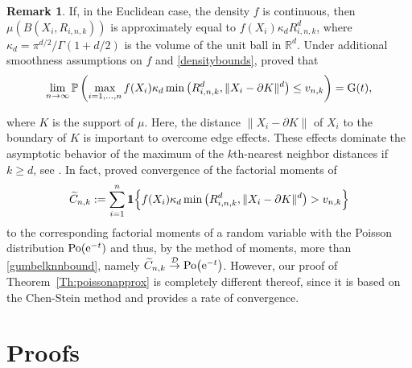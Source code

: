 \documentclass{article}
\theoremstyle{thm}
\theoremstyle{definition}
\newtheorem{remark}[theorem]{Remark}
\theoremstyle{definition}
\theoremstyle{def}
\newcommand{\RR}{\mathbb{R}} %
\newcommand{\PP}{\mathbb{P}} %
\newcommand{\ind}{1\hspace{-0,9ex}1}
\begin{document}
\begin{remark}
If, in the Euclidean case, the density $f$ is continuous, then  $\mu(B(X_i,R_{i,n,k}))$  is approximately equal to $f(X_i)\kappa_d R_{i,n,k}^d$, where
$\kappa_d = \pi^{d/2}/\Gamma(1+d/2)$ is the volume of the unit ball in $\RR^d$. Under additional smoothness assumptions on $f$ and  \eqref{densitybounds},
\cite{HE82, HE83} proved that
\begin{equation}\label{gumbelknnbound}
\lim_{n\to \infty} \PP\left( \max_{i=1,\ldots,n} f(X_i) \kappa_d \min\big(R_{i,n,k}^d, \|X_i-\partial K\|^d\big) \le v_{n,k}\right) = {\rm G}(t),
\end{equation}
\end{remark}
{where $K$ is the support of $\mu$}. Here, the distance $\|X_i-\partial K\|$ of $X_i$ to the boundary of $K$ is important to overcome edge effects. These effects dominate the asymptotic behavior
of the maximum of the $k$th-nearest neighbor distances if $k \ge d$, see  \cite{DH89, DH90}. In fact, \cite{HE82} proved convergence of the factorial moments of
\[
\widetilde{C}_{n,k} := \sum_{i=1}^n \ind \Big{\{} f(X_i)\kappa_d \min\big(R_{i,n,k}^d,\|X_i - \partial K\|^d\big) > v_{n,k} \Big{\}}
\]
to the corresponding factorial moments of a random variable with the Poisson distribution ${\rm Po}({\rm e}^{-t})$ and thus, by the method of moments, more than   \eqref{gumbelknnbound}, namely
$\widetilde{C}_{n,k} \overset{\mathcal{D}}{\rightarrow} {\rm Po}\big({\rm e}^{-t}\big)$. However, our proof of Theorem~\ref{Th:poissonapprox} is completely different thereof, since it is based on the
Chen-Stein method and provides a rate of convergence.

\section{Proofs}
\end{document}
